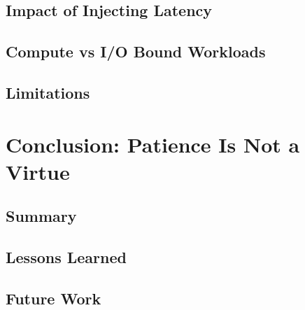 \documentclass[bsc,frontabs,singlespacing,parskip,deptreport,normalheadings]{infthesis}
\begin{document}
\section{Impact of Injecting Latency}

\section{Compute vs I/O Bound Workloads}

\section{Limitations}


\chapter{Conclusion: Patience Is Not a Virtue}

\section{Summary}

\section{Lessons Learned}

\section{Future Work}

 

%
%
%
\end{document}
